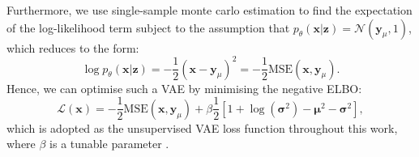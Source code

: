 Furthermore, we use single-sample monte carlo estimation \cite{mohamed_monte_2020} to find the expectation of the log-likelihood term subject to the assumption that $p_\theta(\boldsymbol{x}|\boldsymbol{z})=\mathcal N(\boldsymbol{y}_\mu, 1)$, which reduces to the form:
\begin{equation}
    \log p_{\theta}(\boldsymbol{x}|\boldsymbol{z})=-\frac{1}{2}\left(\boldsymbol{x}-\boldsymbol{y}_\mu\right)^2=-\frac{1}{2}\text{MSE}(\boldsymbol{x}, \boldsymbol{y}_\mu).
\end{equation}
Hence, we can optimise such a VAE by minimising the negative ELBO:
\begin{equation}
    \mathcal L(\boldsymbol{x}) = -\frac{1}{2}\text{MSE}(\boldsymbol{x}, \boldsymbol{y}_\mu)+\beta \frac{1}{2}\left[1+\log(\boldsymbol{\sigma}^2)-\boldsymbol{\mu}^2-\boldsymbol{\sigma}^2\right],
\end{equation}
which is adopted as the unsupervised VAE loss function throughout this work, where $\beta$ is a tunable parameter \cite{higgins_beta-vae_2017}.